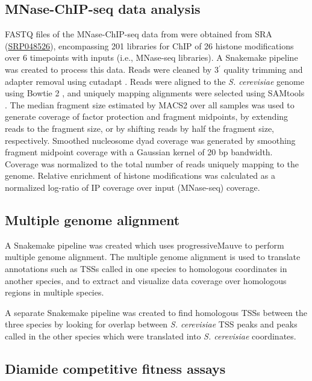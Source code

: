 \subsection{MNase-ChIP-seq data analysis}

FASTQ files of the MNase-ChIP-seq data from \citet{weiner2015} were obtained from SRA (\href{https://www.ncbi.nlm.nih.gov/sra?term=SRP048526}{SRP048526}), encompassing 201 libraries for ChIP of 26 histone modifications over 6 timepoints with inputs (i.e., MNase-seq libraries).
A Snakemake pipeline was created to process this data.
Reads were cleaned by 3$^\prime$ quality trimming and adapter removal using cutadapt \citep{martin2011}.
Reads were aligned to the \textit{S. cerevisiae} genome using Bowtie 2 \citep{langmead2012}, and uniquely mapping alignments were selected using SAMtools \citep{li2009}.
The median fragment size estimated by MACS2 \citep{zhang2008} over all samples was used to generate coverage of factor protection and fragment midpoints, by extending reads to the fragment size, or by shifting reads by half the fragment size, respectively.
Smoothed nucleosome dyad coverage was generated by smoothing fragment midpoint coverage with a Gaussian kernel of 20 bp bandwidth.
Coverage was normalized to the total number of reads uniquely mapping to the genome.
Relative enrichment of histone modifications was calculated as a normalized log-ratio of IP coverage over input (MNase-seq) coverage.

\subsection{Multiple genome alignment}

A Snakemake pipeline was created which uses progressiveMauve \citep{darling2010} to perform multiple genome alignment.
The multiple genome alignment is used to translate annotations such as TSSs called in one species to homologous coordinates in another species, and to extract and visualize data coverage over homologous regions in multiple species.

A separate Snakemake pipeline was created to find homologous TSSs between the three species by looking for overlap between \textit{S. cerevisiae} TSS peaks and peaks called in the other species which were translated into \textit{S. cerevisiae} coordinates.

\subsection{Diamide competitive fitness assays}

